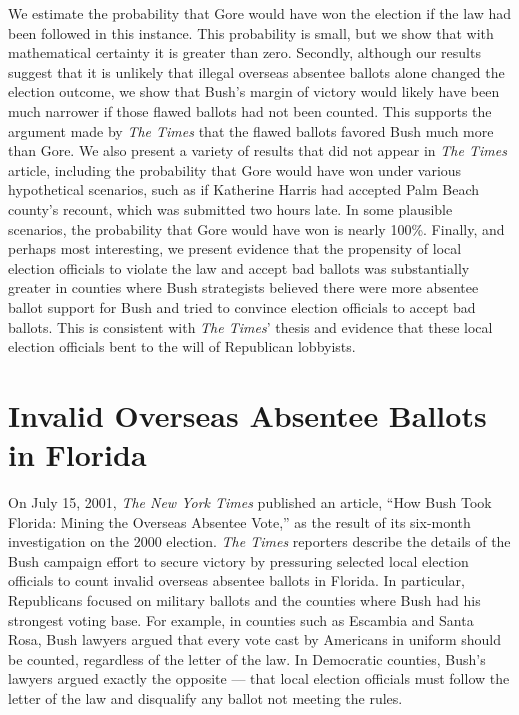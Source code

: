 \documentclass[11pt,titlepage]{article}
\begin{document}
We estimate the probability that Gore would have won the election if
the law had been followed in this instance.  This probability is
small, but we show that with mathematical certainty it is greater than
zero.  Secondly, although our results suggest that it is unlikely that
illegal overseas absentee ballots alone changed the election outcome,
we show that Bush's margin of victory would likely have been much
narrower if those flawed ballots had not been counted.  This supports
the argument made by \emph{The Times} that the flawed ballots favored
Bush much more than Gore.  We also present a variety of results that
did not appear in \emph{The Times} article, including the probability
that Gore would have won under various hypothetical scenarios, such as
if Katherine Harris had accepted Palm Beach county's recount, which
was submitted two hours late.  In some plausible scenarios, the
probability that Gore would have won is nearly 100\%.  Finally, and
perhaps most interesting, we present evidence that the propensity of
local election officials to violate the law and accept bad ballots was
substantially greater in counties where Bush strategists believed
there were more absentee ballot support for Bush and tried to convince
election officials to accept bad ballots.  This is consistent with
\emph{The Times}' thesis and evidence that these local election
officials bent to the will of Republican lobbyists.

\section{Invalid Overseas Absentee Ballots in Florida} \label{s:ballots}

On July 15, 2001, \textit{The New York Times} published an article,
``How Bush Took Florida: Mining the Overseas Absentee Vote,'' as the
result of its six-month investigation on the 2000 election.  \emph{The
  Times} reporters describe the details of the Bush campaign effort to
secure victory by pressuring selected local election officials to
count invalid overseas absentee ballots in Florida.  In particular,
Republicans focused on military ballots and the counties where Bush
had his strongest voting base.  For example, in counties such as
Escambia and Santa Rosa, Bush lawyers argued that every vote cast by
Americans in uniform should be counted, regardless of the letter of
the law.  In Democratic counties, Bush's lawyers argued exactly the
opposite --- that local election officials must follow the letter of
the law and disqualify any ballot not meeting the rules.
\end{document}
